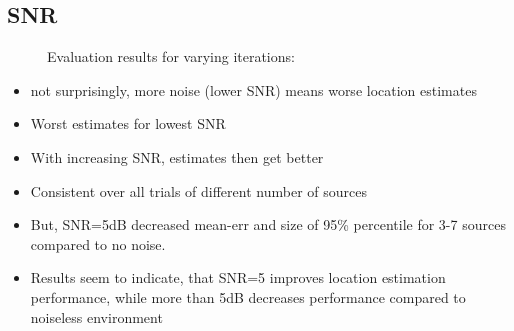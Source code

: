 \subsection{SNR}
%	       
%	       

\begin{figure}[H]
    \setlength\figureheight{7cm}
    \small
    \setlength\figurewidth{\textwidth}
	\centering
	\begin{tikzpicture}
	    \footnotesize
	    
	    
	\end{tikzpicture}
	
	\caption[Evaluation results for varying  iterations]{Evaluation results for varying  iterations: }
	\label{fig:trial1}
\end{figure}

\begin{itemize}
    \item not surprisingly, more noise (lower SNR) means worse location estimates
    \item Worst estimates for lowest SNR
    \item With increasing SNR, estimates then get better
    \item Consistent over all trials of different number of sources
    \item But, SNR=5dB decreased mean-err and size of 95\% percentile for 3-7 sources compared to no noise.
    \item Results seem to indicate, that SNR=5 improves location estimation performance, while more than 5dB decreases performance compared to noiseless environment
\end{itemize}